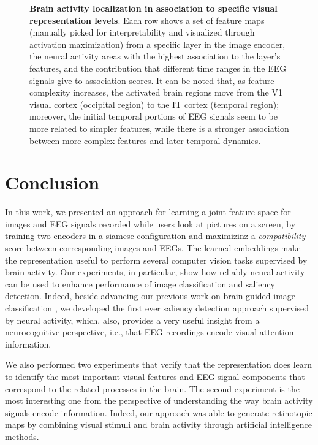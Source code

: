 \documentclass[10pt,journal,compsoc,twocolumn]{IEEEtran}
\begin{document}
\begin{figure*}
{}

\caption{\textbf{Brain activity localization in association to specific visual representation levels}. Each row shows a set of feature maps (manually picked for interpretability and visualized through activation maximization) from a specific layer in the image encoder, the neural activity areas with the highest association to the layer's features, and the contribution that different time ranges in the EEG signals give to association scores. It can be noted that, as feature complexity increases, the activated brain regions move from the V1 visual cortex (occipital region) to the IT cortex (temporal region); moreover, the initial temporal portions of EEG signals seem to be more related to simpler features, while there is a stronger association between more complex features and later temporal dynamics.}
\label{fig:eeg_vis_repr}
\end{figure*}

\section{Conclusion}\label{sec:conclusions}
In this work, we presented an approach for learning a joint feature space for images and EEG signals recorded while users look at pictures on a screen, by training two encoders in a siamese configuration and maximizinz a \emph{compatibility} score between corresponding images and EEGs. The learned embeddings make the representation useful to perform several computer vision tasks supervised by brain activity. Our experiments, in particular, show how reliably neural activity can be used to enhance performance of image classification and saliency detection. Indeed, beside advancing our previous work on brain-guided image classification \cite{Spampinato2016deep}, we developed the first ever saliency detection approach supervised by neural activity, which, also, provides a very useful insight from a neurocognitive perspective, i.e., that EEG recordings encode visual attention information. 

We also performed two experiments that verify that the representation does learn to identify the most important visual features and EEG signal components that correspond to the related processes in the brain. The second experiment is the most interesting one from the perspective of understanding the way brain activity signals encode information. Indeed, our approach was able to generate retinotopic maps by combining visual stimuli and brain activity through artificial intelligence methods. 
\end{document}
